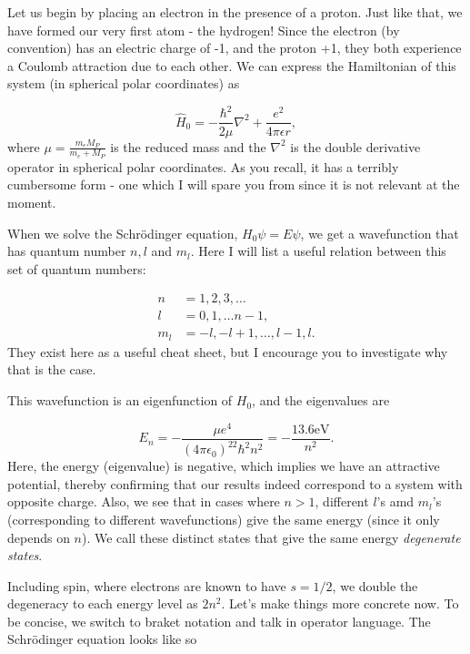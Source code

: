 \documentclass{article}
\numberwithin{equation}{section} %
\begin{document}
Let us begin by placing an electron in the presence of a proton. Just like that, we have formed our very first atom - the hydrogen! Since the electron (by convention) has an electric charge of -1, and the proton +1, they both experience a Coulomb attraction due to each other. We can express the Hamiltonian of this system (in spherical polar coordinates) as

\begin{equation}
\hat{H}_0=-\frac{\hbar^2}{2\mu}\nabla^2 + \frac{e^2}{4\pi\epsilon r},
\label{h atom hamiltonian}
\end{equation}
where $\mu=\frac{m_eM_P}{m_e+M_P}$ is the reduced mass and the $\nabla^2$ is the double derivative operator in spherical polar coordinates. As you recall, it has a terribly cumbersome form - one which I will spare you from since it is not relevant at the moment.

When we solve the Schr\"odinger equation, $H_0\psi=E\psi$, we get a wavefunction that has quantum number $n, l$ and $m_l$. Here I will list a useful relation between this set of quantum numbers:

\begin{equation}
\begin{split}
n&=1,2,3,\dots \\
l&=0,1,\dots n-1,\\
m_l&=-l,-l+1,\dots,l-1,l.
\end{split}
\end{equation}
They exist here as a useful cheat sheet, but I encourage you to investigate why that is the case. 

This wavefunction is an eigenfunction of $H_0$, and the eigenvalues are 

\begin{equation}
E_n=-\frac{\mu e^4}{(4\pi\epsilon_0)^22\hbar^2n^2}=-\frac{13.6\text{eV}}{n^2}.
\label{h atom energy}
\end{equation}
Here, the energy (eigenvalue) is negative, which implies we have an attractive potential, thereby confirming that our results indeed correspond to a system with opposite charge. Also, we see that in cases where $n>1$, different $l$'s amd $m_l$'s (corresponding to different wavefunctions) give the same energy (since it only depends on $n$). We call these distinct states that give the same energy \textit{degenerate states}.


Including spin, where electrons are known to have $s=1/2$, we double the degeneracy to each energy level as $2n^2$. Let's make things more concrete now. To be concise, we switch to braket notation and talk in operator language. The Schr\"odinger equation looks like so
\end{document}
